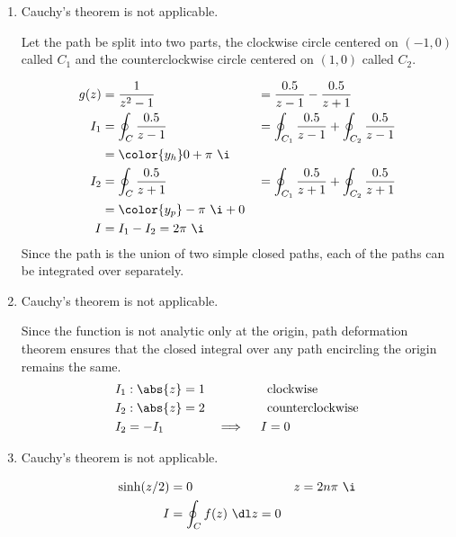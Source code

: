 \begin{enumerate}
    \item Cauchy's theorem \textcolor{y_p}{is not applicable}. \par
          Let the path be split into two parts, the clockwise circle centered on
          $ (-1, 0) $ called $ C_1 $ and the counterclockwise circle centered on
          $ (1, 0) $ called $ C_2 $. \par
          \begin{align}
              g(z) & = \frac{1}{z^2 - 1}                                         &
                   & = \frac{0.5}{z-1} - \frac{0.5}{z+1}                           \\
              I_1  & = \oint_C \frac{0.5}{z-1}                                   &
                   & = \oint_{C_1} \frac{0.5}{z-1} + \oint_{C_2} \frac{0.5}{z-1}   \\
                   & = \color{y_h} 0 + \pi\ \i                                     \\
              I_2  & = \oint_C \frac{0.5}{z+1}                                   &
                   & = \oint_{C_1} \frac{0.5}{z+1} + \oint_{C_2} \frac{0.5}{z+1}   \\
                   & = \color{y_p} -\pi\ \i + 0                                    \\
              I    & = I_1 - I_2 = 2\pi\ \i
          \end{align}
          Since the path is the union of two simple closed paths, each of the paths
          can be integrated over separately.

    \item Cauchy's theorem \textcolor{y_p}{is not applicable}. \par
          Since the function is not analytic only at the origin, path deformation
          theorem ensures that the closed integral over any path encircling the origin
          remains the same.
          \begin{align}
              I_1              & : \abs{z} = 1           &
                               & \text{clockwise}          \\
              I_2              & : \abs{z} = 2           &
                               & \text{counterclockwise}   \\
              I_2              & = -I_1                  &
              \implies \quad I & = 0
          \end{align}

    \item Cauchy's theorem \textcolor{y_p}{is not applicable}. \par
          \begin{align}
              \sinh(z/2) & = 0                       &
              z          & = 2n\pi\ \i                 \\
              I          & = \oint_C f(z)\ \dl z = 0
          \end{align}


\end{enumerate}
